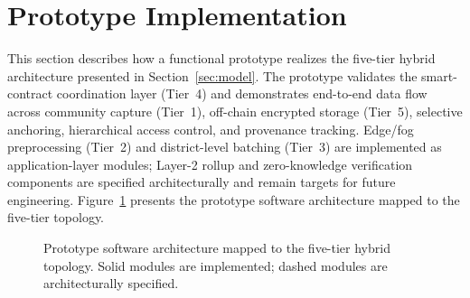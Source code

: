 \documentclass[AMA,LATO1COL]{WileyNJD-v2}
\begin{document}
\section{Prototype Implementation}\label{sec:implementation}

This section describes how a functional prototype realizes the five-tier hybrid architecture presented in Section~\ref{sec:model}. The prototype validates the smart-contract coordination layer (Tier~4) and demonstrates end-to-end data flow across community capture (Tier~1), off-chain encrypted storage (Tier~5), selective anchoring, hierarchical access control, and provenance tracking. Edge/fog preprocessing (Tier~2) and district-level batching (Tier~3) are implemented as application-layer modules; Layer-2 rollup and zero-knowledge verification components are specified architecturally and remain targets for future engineering. Figure~\ref{fig:proto_arch} presents the prototype software architecture mapped to the five-tier topology.

\begin{figure}[!ht]
\centering
{}
\caption{Prototype software architecture mapped to the five-tier hybrid topology. Solid modules are implemented; dashed modules are architecturally specified.}\label{fig:proto_arch}
\end{figure}
\end{document}
